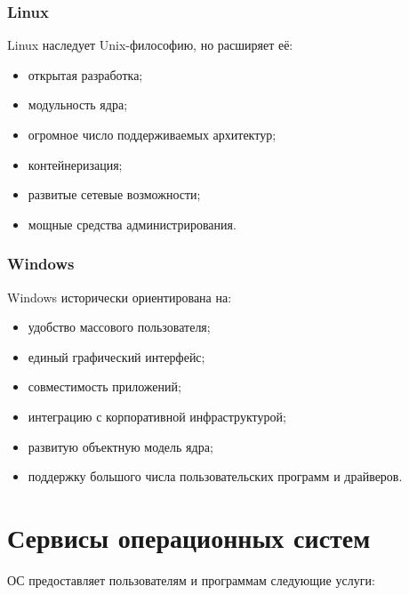 \documentclass[12pt,a4paper]{article}
\begin{document}
\subsubsection*{Linux}

Linux наследует Unix-философию, но расширяет её:

\begin{itemize}
    \item открытая разработка;
    \item модульность ядра;
    \item огромное число поддерживаемых архитектур;
    \item контейнеризация;
    \item развитые сетевые возможности;
    \item мощные средства администрирования.
\end{itemize}

\subsubsection*{Windows}

Windows исторически ориентирована на:

\begin{itemize}
    \item удобство массового пользователя;
    \item единый графический интерфейс;
    \item совместимость приложений;
    \item интеграцию с корпоративной инфраструктурой;
    \item развитую объектную модель ядра;
    \item поддержку большого числа пользовательских программ и драйверов.
\end{itemize}

\section{Сервисы операционных систем}

ОС предоставляет пользователям и программам следующие услуги:
\end{document}
